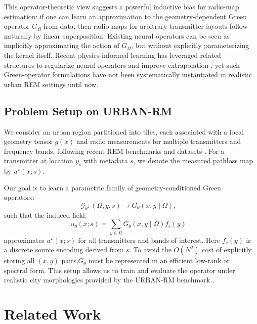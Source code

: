 \documentclass{article}
\begin{document}
This operator-theoretic view suggests a powerful inductive bias for radio-map estimation: if one can learn an approximation to the geometry-dependent Green operator $G_\Omega$ from data, then radio maps for arbitrary transmitter layouts follow naturally by linear superposition. Existing neural operators can be seen as implicitly approximating the action of $G_\Omega$, but without explicitly parameterizing the kernel itself. Recent physics-informed learning has leveraged related structures to regularize neural operators and improve extrapolation \cite{li2021physics,li2022pikno}, yet such Green-operator formulations have not been systematically instantiated in realistic urban REM settings until now.


\subsection{Problem Setup on URBAN-RM}
We consider an urban region partitioned into tiles, each associated with a local geometry tensor $g(x)$ and radio measurements for multiple transmitters and frequency bands, following recent REM benchmarks and datasets \cite{yapar2024radiomapchallenge,zhang2024spectrumnet,alkhateeb2019deepmimo,muller2022radiomap3d}. For a transmitter at location $y_s$ with metadata $s$, we denote the measured pathloss map by $u^\star(x; s)$. 

Our goal is to learn a parametric family of geometry-conditioned Green operators:
\begin{equation}
\mathcal{G}_\theta : (\Omega, g, s) \longrightarrow G_\theta(x, y \mid \Omega),
\end{equation}
such that the induced field:
\begin{equation}
u_\theta(x; s) = \sum_{y \in \Omega} G_\theta(x, y \mid \Omega) f_s(y)
\end{equation}
approximates $u^\star(x; s)$ for all transmitters and bands of interest. Here $f_s(y)$ is a discrete source encoding derived from $s$. To avoid the $O(N^2)$ cost of explicitly storing all $(x, y)$ pairs,$G_\theta$ must be represented in an efficient low-rank or spectral form. This setup allows us to train and evaluate the operator under realistic city morphologies provided by the URBAN-RM benchmark \cite{feng2025survey,yapar2024radiomapchallenge,zhang2024spectrumnet}.


\section{Related Work}
\label{sec:related_work}
\end{document}
